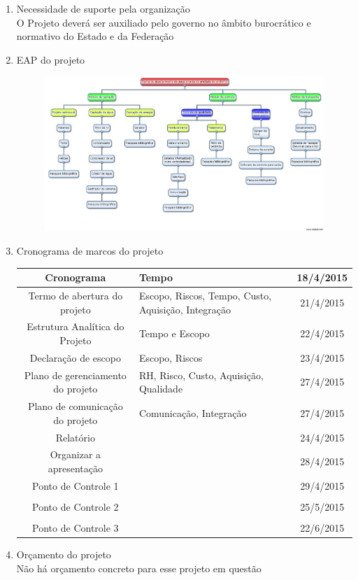 \begin{enumerate}
\begin{table}[!ht]
\begin{tabular}{|c|c|c|c|}
\end{tabular}
\end{table}
\FloatBarrier

\item Necessidade de suporte pela organização\\
O Projeto deverá ser auxiliado pelo governo no âmbito burocrático e normativo do Estado e da Federação

\item EAP do projeto
\begin{figure}[h]
\centering
\includegraphics[scale=0.3]{editaveis/figuras/EAP}
\end{figure}
\FloatBarrier

\item Cronograma de marcos do projeto
\begin{table}[!h]
\begin{tabular}{|c|p{6cm}|c|}
Cronograma & Tempo & 18/4/2015\\ \hline
Termo de abertura do projeto&Escopo, Riscos, Tempo, Custo, Aquisição, Integração&21/4/2015\\ \hline
Estrutura Analítica do Projeto&Tempo e Escopo&22/4/2015\\ \hline
Declaração de escopo&Escopo, Riscos&23/4/2015\\ \hline
Plano de gerenciamento do projeto&RH, Risco, Custo, Aquisição, Qualidade&27/4/2015\\ \hline
Plano de comunicação do projeto&Comunicação, Integração&27/4/2015\\ \hline
Relatório& &24/4/2015\\ \hline
Organizar a apresentação& &28/4/2015\\ \hline
Ponto de Controle 1& &29/4/2015\\ \hline
&&\\ \hline
Ponto de Controle 2&&25/5/2015\\ \hline
&&\\ \hline
Ponto de Controle 3&&22/6/2015\\ \hline
\end{tabular}
\end{table}

\item Orçamento do projeto\\
Não há orçamento concreto para esse projeto em questão

\end{enumerate}
